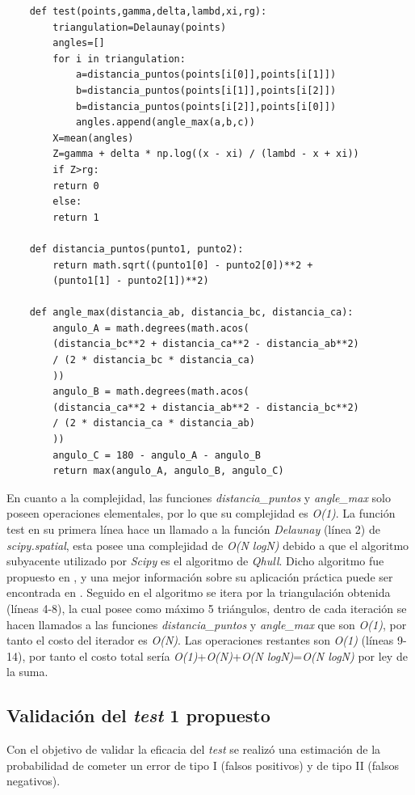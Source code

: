 \documentclass[12pt]{report}
\begin{document}
\begin{lstlisting}
	def test(points,gamma,delta,lambd,xi,rg):
		triangulation=Delaunay(points)
		angles=[]
		for i in triangulation:
			a=distancia_puntos(points[i[0]],points[i[1]])
			b=distancia_puntos(points[i[1]],points[i[2]])
			b=distancia_puntos(points[i[2]],points[i[0]])
			angles.append(angle_max(a,b,c))
		X=mean(angles)
		Z=gamma + delta * np.log((x - xi) / (lambd - x + xi))
		if Z>rg:
		return 0
		else:
		return 1
	
	def distancia_puntos(punto1, punto2):
		return math.sqrt((punto1[0] - punto2[0])**2 +
		(punto1[1] - punto2[1])**2)
	
	def angle_max(distancia_ab, distancia_bc, distancia_ca):
		angulo_A = math.degrees(math.acos(
		(distancia_bc**2 + distancia_ca**2 - distancia_ab**2) 
		/ (2 * distancia_bc * distancia_ca)
		))
		angulo_B = math.degrees(math.acos(
		(distancia_ca**2 + distancia_ab**2 - distancia_bc**2) 
		/ (2 * distancia_ca * distancia_ab)
		))
		angulo_C = 180 - angulo_A - angulo_B  
		return max(angulo_A, angulo_B, angulo_C)
\end{lstlisting}

En cuanto a la complejidad, las funciones \textit{distancia\_puntos} y \textit{angle\_max} solo poseen operaciones elementales, por lo que su complejidad es \textit{O(1)}. La función test en su primera línea hace un llamado a la función  \textit{Delaunay} (línea 2) de \textit{scipy.spatial}, esta posee una complejidad de \textit{O(N logN)} debido a que el algoritmo subyacente utilizado por \textit{Scipy} es el algoritmo de \textit{Qhull}. Dicho algoritmo fue propuesto en \cite{31}, y una mejor información sobre su aplicación práctica puede ser encontrada en \cite{32}. Seguido en el algoritmo se itera por la triangulación obtenida (líneas 4-8), la cual posee como máximo 5 triángulos, dentro de cada iteración se hacen llamados a las  funciones \textit{distancia\_puntos} y \textit{angle\_max}  que son \textit{O(1)}, por tanto el costo del iterador es \textit{O(N)}. Las operaciones restantes son \textit{O(1)} (líneas 9-14), por tanto el costo total sería \textit{O(1)}+\textit{O(N)}+\textit{O(N logN)}=\textit{O(N logN)} por ley de la suma.
\subsection{Validación del \textit{test} 1 propuesto}
\label{sec:1.4}
	
	Con el objetivo de validar la eficacia del \textit{test} se realizó una estimación de la probabilidad de cometer un error de tipo I (falsos positivos) y de tipo II (falsos negativos).
		 
\end{document}
